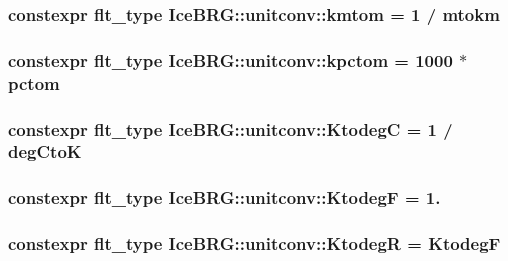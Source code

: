 \subsubsection[{kmtom}]{\setlength{\rightskip}{0pt plus 5cm}constexpr {\bf flt\+\_\+type} Ice\+B\+R\+G\+::unitconv\+::kmtom = 1 / {\bf mtokm}}\label{namespaceIceBRG_1_1unitconv_a7376e879917949c32e630c898b3ccef4}
\hypertarget{namespaceIceBRG_1_1unitconv_a939e167c62fea513edb861b7a62786c2}{}
\subsubsection[{kpctom}]{\setlength{\rightskip}{0pt plus 5cm}constexpr {\bf flt\+\_\+type} Ice\+B\+R\+G\+::unitconv\+::kpctom = 1000 $\ast$ {\bf pctom}}\label{namespaceIceBRG_1_1unitconv_a939e167c62fea513edb861b7a62786c2}
\hypertarget{namespaceIceBRG_1_1unitconv_a63bbe9a33b095aa0a83a6327bd54cb22}{}
\subsubsection[{Ktodeg\+C}]{\setlength{\rightskip}{0pt plus 5cm}constexpr {\bf flt\+\_\+type} Ice\+B\+R\+G\+::unitconv\+::\+Ktodeg\+C = 1 / {\bf deg\+Cto\+K}}\label{namespaceIceBRG_1_1unitconv_a63bbe9a33b095aa0a83a6327bd54cb22}
\hypertarget{namespaceIceBRG_1_1unitconv_ad978522ad440d2da6576c8bdad009869}{}
\subsubsection[{Ktodeg\+F}]{\setlength{\rightskip}{0pt plus 5cm}constexpr {\bf flt\+\_\+type} Ice\+B\+R\+G\+::unitconv\+::\+Ktodeg\+F = 1.}\label{namespaceIceBRG_1_1unitconv_ad978522ad440d2da6576c8bdad009869}
\hypertarget{namespaceIceBRG_1_1unitconv_aa882dbf226822a85a52f8782d0161a2d}{}
\subsubsection[{Ktodeg\+R}]{\setlength{\rightskip}{0pt plus 5cm}constexpr {\bf flt\+\_\+type} Ice\+B\+R\+G\+::unitconv\+::\+Ktodeg\+R = {\bf Ktodeg\+F}}\label{namespaceIceBRG_1_1unitconv_aa882dbf226822a85a52f8782d0161a2d}
\hypertarget{namespaceIceBRG_1_1unitconv_aac1606e07695af7671017f914e88fcaf}{}
